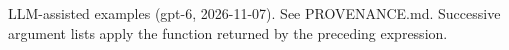 \documentclass[11pt]{article}
\begin{document}

\bigskip
{\footnotesize LLM-assisted examples (gpt-6, 2026-11-07). See PROVENANCE.md.
Successive argument lists apply the function returned by the preceding expression.}
\end{document}
